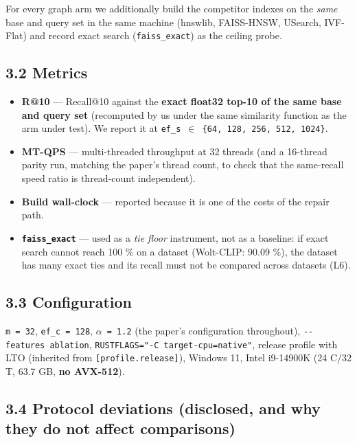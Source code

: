 \documentclass[
  10pt,
]{article}
\providecommand{\tightlist}{%
  \setlength{\itemsep}{0pt}\setlength{\parskip}{0pt}}
\begin{document}
For every graph arm we additionally build the competitor indexes on the
\emph{same} base and query set in the same machine (hnswlib, FAISS-HNSW,
USearch, IVF-Flat) and record exact search (\texttt{faiss\_exact}) as
the ceiling probe.

\subsection{3.2 Metrics}\label{metrics}

\begin{itemize}
\tightlist
\item
  \textbf{R@10} --- Recall@10 against the \textbf{exact float32 top-10
  of the same base and query set} (recomputed by us under the same
  similarity function as the arm under test). We report it at
  \texttt{ef\_s\ $\in$\ \{64,\ 128,\ 256,\ 512,\ 1024\}}.
\item
  \textbf{MT-QPS} --- multi-threaded throughput at 32 threads (and a
  16-thread parity run, matching the paper's thread count, to check that
  the same-recall speed ratio is thread-count independent).
\item
  \textbf{Build wall-clock} --- reported because it is one of the costs
  of the repair path.
\item
  \textbf{\texttt{faiss\_exact}} --- used as a \emph{tie floor}
  instrument, not as a baseline: if exact search cannot reach 100 \% on
  a dataset (Wolt-CLIP: 90.09 \%), the dataset has many exact ties and
  its recall must not be compared across datasets (L6).
\end{itemize}

\subsection{3.3 Configuration}\label{configuration}

\texttt{m\ =\ 32}, \texttt{ef\_c\ =\ 128}, \texttt{$\alpha$\ =\ 1.2} (the
paper's configuration throughout), \texttt{-\/-features\ ablation},
\texttt{RUSTFLAGS="-C\ target-cpu=native"}, release profile with LTO
(inherited from \texttt{{[}profile.release{]}}), Windows 11, Intel
i9-14900K (24 C/32 T, 63.7 GB, \textbf{no AVX-512}).

\subsection{3.4 Protocol deviations (disclosed, and why they do not
affect
comparisons)}\label{protocol-deviations-disclosed-and-why-they-do-not-affect-comparisons}
\end{document}
